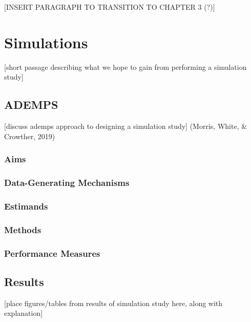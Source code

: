 \documentclass[12pt, twoside]{amherstthesis}
\begin{document}
{[}INSERT PARAGRAPH TO TRANSITION TO CHAPTER 3 (?){]}

\hypertarget{simulations}{%
\chapter{Simulations}\label{simulations}}

{[}short passage describing what we hope to gain from performing a simulation study{]}

\hypertarget{ademps}{%
\section{ADEMPS}\label{ademps}}

{[}discuss ademps approach to designing a simulation study{]} (Morris, White, \& Crowther, 2019)

\hypertarget{aims}{%
\subsection{Aims}\label{aims}}

\hypertarget{data_generating_mechanisms}{%
\subsection{Data-Generating Mechanisms}\label{data_generating_mechanisms}}

\hypertarget{estimands}{%
\subsection{Estimands}\label{estimands}}

\hypertarget{methods}{%
\subsection{Methods}\label{methods}}

\hypertarget{performance_measures}{%
\subsection{Performance Measures}\label{performance_measures}}

\hypertarget{results}{%
\section{Results}\label{results}}

{[}place figures/tables from results of simulation study here, along with explanation{]}
\end{document}
